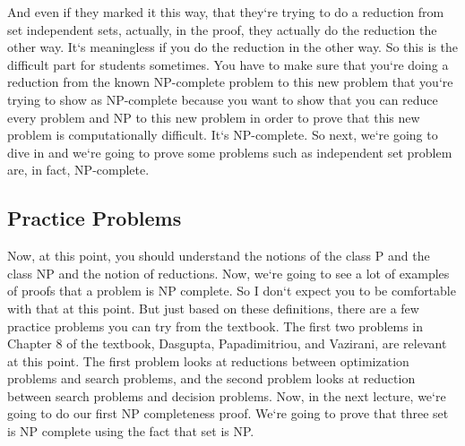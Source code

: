 And even if they marked it this way, that they`re trying to do a reduction from set independent sets, actually, in the proof, they actually do the reduction the other way.
It`s meaningless if you do the reduction in the other way.
So this is the difficult part for students sometimes.
You have to make sure that you`re doing a reduction from the known NP-complete problem to this new problem that you`re trying to show as NP-complete because you want to show that you can reduce every problem and NP to this new problem in order to prove that this new problem is computationally difficult.
It`s NP-complete.
So next, we`re going to dive in and we`re going to prove some problems such as independent set problem are, in fact, NP-complete.

\subsection{Practice Problems}
Now, at this point, you should understand the notions of the class P and the class NP and the notion of reductions.
Now, we`re going to see a lot of examples of proofs that a problem is NP complete.
So I don`t expect you to be comfortable with that at this point.
But just based on these definitions, there are a few practice problems you can try from the textbook.
The first two problems in Chapter 8 of the textbook, Dasgupta, Papadimitriou, and Vazirani, are relevant at this point.
The first problem looks at reductions between optimization problems and search problems, and the second problem looks at reduction between search problems and decision problems.
Now, in the next lecture, we`re going to do our first NP completeness proof.
We`re going to prove that three set is NP complete using the fact that set is NP\@.

